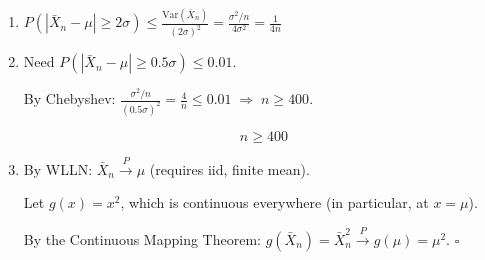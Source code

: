 \documentclass[11pt]{article}
\begin{document}
\begin{enumerate}[label=(\alph*)]
\item $P(|\bar X_n - \mu| \ge 2\sigma) \le \frac{\text{Var}(\bar X_n)}{(2\sigma)^2} = \frac{\sigma^2/n}{4\sigma^2} = \boxed{\frac{1}{4n}}$

\item Need $P(|\bar X_n - \mu| \ge 0.5\sigma) \le 0.01$.

By Chebyshev: $\frac{\sigma^2/n}{(0.5\sigma)^2} = \frac{4}{n} \le 0.01 \;\Rightarrow\; n \ge 400$.

$$\boxed{n \ge 400}$$

\item By WLLN: $\bar X_n \xrightarrow{P} \mu$ (requires iid, finite mean).

Let $g(x) = x^2$, which is continuous everywhere (in particular, at $x = \mu$).

By the Continuous Mapping Theorem: $g(\bar X_n) = \bar X_n^2 \xrightarrow{P} g(\mu) = \mu^2$. \quad $\square$
\end{enumerate}
\end{document}
